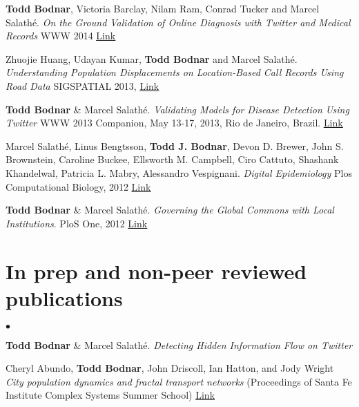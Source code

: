 \documentclass[margin,line]{res}
\newcommand{\linkToUrl}[1]{{\color{blue}\underline{\href{#1}{Link}}}}
\newenvironment{list2}{
  \begin{list}{$\bullet$}{%
      \setlength{\itemsep}{0in}
      \setlength{\parsep}{0in} \setlength{\parskip}{0in}
      \setlength{\topsep}{0in} \setlength{\partopsep}{0in} 
      \setlength{\leftmargin}{10pt}}}{\end{list}}
\begin{document}
\begin{resume}
\begin{etaremune}[start=5,leftmargin=13pt]
\item \textbf{Todd Bodnar}, Victoria Barclay, Nilam Ram, Conrad Tucker and Marcel Salath\'e. \textit{On the Ground Validation of Online Diagnosis with Twitter and Medical Records} WWW 2014 \linkToUrl{http://bit.ly/R82tZp}

\item Zhuojie Huang, Udayan Kumar, \textbf{Todd Bodnar} and Marcel Salath\'e. \textit{Understanding Population Displacements on Location-Based Call Records Using Road Data} SIGSPATIAL 2013, \linkToUrl{http://bit.ly/1dAjC5o}

\item \textbf{Todd Bodnar} \& Marcel Salath\'e. \textit{Validating Models for Disease Detection Using Twitter}  WWW 2013 Companion, May 13-17, 2013, Rio de Janeiro, Brazil. \linkToUrl{http://bit.ly/WWL1Gr}

\item Marcel Salath\'e, Linus Bengtsson, \textbf{Todd J. Bodnar}, Devon D. Brewer, John S. Brownstein, Caroline Buckee, Ellsworth M. Campbell, Ciro Cattuto, Shashank Khandelwal, Patricia L. Mabry,  Alessandro Vespignani. \textit{Digital Epidemiology} Plos Computational Biology, 2012 \linkToUrl{http://bitly.com/PO2fSx}

\item \textbf{Todd Bodnar} \& Marcel Salath\'e. \textit{Governing the Global Commons with Local Institutions}. PloS One, 2012 \linkToUrl{http://bit.ly/TtsZd5}
\end{etaremune}

\section{\sc In prep and non-peer reviewed publications}

\begin{list2}
\item \textbf{Todd Bodnar} \& Marcel Salath\'e. \textit{Detecting Hidden Information Flow on Twitter} %
\item Cheryl Abundo, \textbf{Todd Bodnar}, John Driscoll, Ian Hatton, and Jody Wright
 \textit{City population dynamics and fractal transport networks} (Proceedings of Santa Fe Institute Complex Systems Summer School) \linkToUrl{bit.ly/19A22vY}%
\end{list2}


\end{resume}
\end{document}
